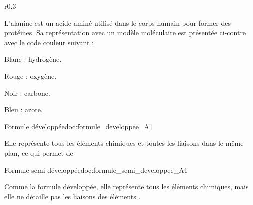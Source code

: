 \vspace*{8pt}
\begin{wrapfigure}[5]{r}{0.3\linewidth}
  \vspace*{-22pt}
\end{wrapfigure}

L'alanine est un acide aminé utilisé dans le corps humain pour former des protéines.
Sa représentation avec un modèle moléculaire est présentée ci-contre avec le code couleur suivant :
\begin{listePoints}[2]
  \item Blanc : hydrogène.
  \item Rouge : oxygène.
  \item Noir : carbone.
  \item Bleu : azote.
\end{listePoints}

\medskip
{}



\newpage
\vspace*{-30pt}
\begin{doc}{Formule développée}{doc:formule_developpee_A1}
  \begin{importants}  
    Elle représente tous les éléments chimiques et toutes les liaisons dans le même plan, ce qui permet de 
  \end{importants}

  \exemple*
  \vspace*{-18pt}
  \begin{center}
    \qq{}
  \end{center}
\end{doc}


\begin{doc}{Formule semi-développée}{doc:formule_semi_developpee_A1}
  \begin{importants}
    Comme la formule développée, elle représente tous les éléments chimiques, mais elle ne détaille pas les liaisons des éléments .
  \end{importants}

  \exemple*
  \vspace*{-8pt}
  \begin{center}
    \qq{}
  \end{center}
\end{doc}

